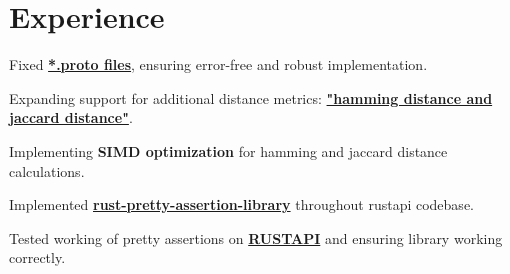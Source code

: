 \documentclass[]{deedy-resume-openfont}
\begin{document}
\hfill
\begin{minipage}[t]{0.66\textwidth} 


\section{Experience}
\vspace{\topsep} %
\begin{tightemize}
\item Fixed \href{https://github.com/qdrant/qdrant/pull/1569}{\textbf{*.proto files}}, ensuring error-free and robust implementation.  
\item Expanding support for additional distance metrics: \href{https://docs.google.com/document/d/13zb_dO2DjFi_eCyYltI8MeyBeiB537Xc2n8netrZdek/edit?usp=sharing}{\textbf{"hamming distance and jaccard distance"}}.\\ 
\item Implementing \textbf{SIMD optimization} for hamming and jaccard distance calculations.\\
 
\end{tightemize}
\sectionsep

\vspace{\topsep} %
\begin{tightemize}
\item Implemented \href{https://github.com/ndelvalle/rustapi/pull/260}{\textbf{rust-pretty-assertion-library}} throughout rustapi codebase.\\ 
\item Tested working of pretty assertions on \href{https://github.com/rust-pretty-assertions/rust-pretty-assertions}{\textbf{RUSTAPI}} and ensuring library working correctly. 
\end{tightemize}
\sectionsep


\end{minipage}
\end{document}
